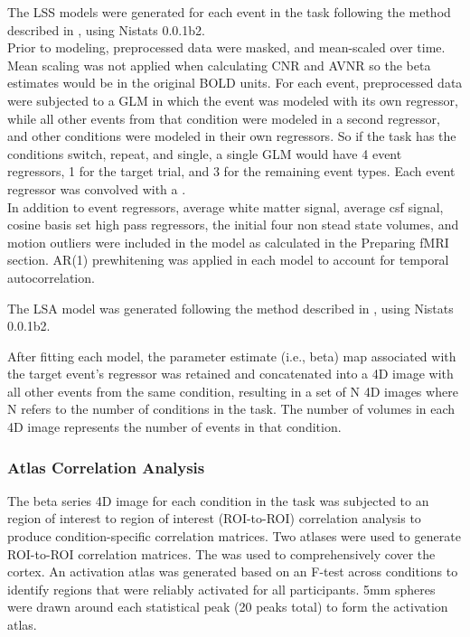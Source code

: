 \documentclass[10pt,letterpaper]{article}
\begin{document}
The LSS models were generated for each event in
the task following the method described in \cite{Turner2012a}, using
Nistats 0.0.1b2.\\
Prior to modeling, preprocessed data were masked, and mean-scaled over
time.
Mean scaling was not applied when calculating CNR and AVNR so the
beta estimates would be in the original BOLD units.
For each event, preprocessed data were subjected to a GLM
in which the event was modeled with its own regressor, while
all other events from that condition were modeled in a second regressor,
and other conditions were modeled in their own regressors.
So if the task has the conditions switch, repeat, and single, 
a single GLM would have 4 event regressors, 1 for the target
trial, and 3 for the remaining event types.
Each event regressor was convolved with a \cite[glover hemodynamic response
function]{Glover1999}.\\
In addition to event regressors, average white matter signal, average csf signal,
cosine basis set high pass regressors, the initial four non stead state volumes, 
and motion outliers were included
in the model as calculated in the Preparing fMRI section.
AR(1) prewhitening was applied in each model to account
for temporal autocorrelation.

The LSA model was generated following the method described in
\cite[Rissman 2004]{Rissman2004}, using Nistats 0.0.1b2.

After fitting each model, the parameter estimate (i.e., beta) map
associated with the target event's regressor was retained and
concatenated into a 4D image with all other events from the same
condition, resulting in a set of N 4D images where N refers to the
number of conditions in the task. The number of volumes in each 4D image
represents the number of events in that condition.

\hypertarget{atlas-correlation-analysis}{%
\subsubsection{Atlas Correlation
Analysis}\label{atlas-correlation-analysis}}

The beta series 4D image for each condition in the task was subjected to
an region of interest to region of interest (ROI-to-ROI) correlation analysis
to produce condition-specific correlation matrices.
Two atlases were used to generate ROI-to-ROI correlation matrices.
The \cite[Schaefer Atlas (400 parcels, 17 networks)]{Schaefer2017} was
used to comprehensively cover the cortex.
An activation atlas was generated based on an F-test across conditions
to identify regions that were reliably activated for all participants.
5mm spheres were drawn around each statistical peak (20 peaks total)
to form the activation atlas.
\end{document}
